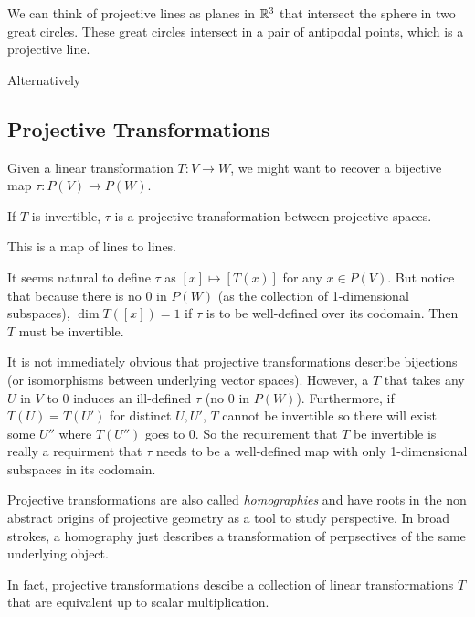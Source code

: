 \documentclass[10pt]{article}
\begin{document}
We can think of projective lines as planes in $\mathbb{R}^3$ that intersect the sphere
in two great circles. These great circles intersect in a pair of antipodal
points, which is a projective line.

Alternatively


\subsection{Projective Transformations}

Given a linear transformation $T: V \to W$, we might want to recover a bijective map $\tau: P(V) \to P(W)$.

\begin{definition}
	If $T$ is invertible, $\tau$ is a projective transformation between
	projective spaces.
\end{definition}

This is a map of lines to lines.

It seems natural to define $\tau$ as $[x] \mapsto [T(x)]$ for any $x \in P(V)$.
But notice that because there is no $0$ in $P(W)$ (as the collection of 1-dimensional subspaces), 
$\dim T([x]) = 1$ if $\tau$ is to be well-defined over its codomain. Then $T$
must be invertible.

\begin{note}
	It is not immediately obvious that projective transformations describe
	bijections (or isomorphisms between underlying vector spaces). However, a $T$
	that takes any $U$ in $V$ to $0$ induces an ill-defined $\tau$ (no $0$ in
	$P(W)$). Furthermore, if $T(U) = T(U')$ for distinct $U, U'$, $T$ cannot be
	invertible so there will exist some $U''$ where $T(U'')$ goes to $0$. So the
	requirement that $T$ be invertible is really a requirment that $\tau$ needs
	to be a well-defined map with only 1-dimensional subspaces in its codomain.
\end{note}

\begin{note}
	Projective transformations are also called
	\textit{homographies} and have roots
	in the non abstract origins of projective geometry as a tool to study
	perspective. In broad strokes, a homography just describes a
	transformation of perpsectives of the same underlying object.
\end{note}

In fact, projective transformations descibe a collection of linear
transformations $T$ that are equivalent up to scalar multiplication.
\end{document}
